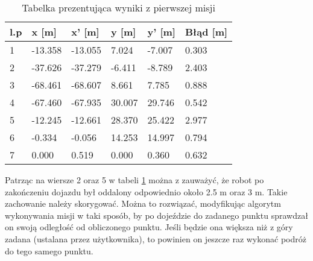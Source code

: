 {{        \begin{table}[h!]
            \centering
            \begin{tabular}{|l|l|l|l|l|l|}
                \hline
                l.p & x {[}m{]} & x' {[}m{]} & y {[}m{]} & y' {[}m{]} & Błąd {[}m{]} \\ \hline
                1   & -13.358   & -13.055    & 7.024     & -7.007     & 0.303 \\ \hline
                2   & -37.626   & -37.279    & -6.411    & -8.789     & 2.403 \\ \hline
                3   & -68.461   & -68.607    & 8.661     & 7.785      & 0.888 \\ \hline
                4   & -67.460   & -67.935    & 30.007    & 29.746     & 0.542 \\ \hline
                5   & -12.245   & -12.661    & 28.370    & 25.422     & 2.977 \\ \hline
                6   & -0.334    & -0.056     & 14.253    & 14.997     & 0.794 \\ \hline
                7   &  0.000       & 0.519    &  0.000   & 0.360      & 0.632 \\ \hline
            \end{tabular}
            \caption{Tabelka prezentująca wyniki z pierwszej misji}
            \label{second_mission_table}
        \end{table}

        Patrząc na wiersze 2 oraz 5 w tabeli \ref{second_mission_table} można z zauważyć, że robot po zakończeniu dojazdu był oddalony odpowiednio około 2.5 m oraz 3 m. Takie zachowanie należy skorygować. Można to rozwiązać, modyfikując algorytm wykonywania misji w taki sposób, by po dojeździe do zadanego punktu sprawdzał on swoją odległość od obliczonego punktu. Jeśli będzie ona większa niż z góry zadana (ustalana przez użytkownika), to powinien on jeszcze raz wykonać podróż do tego samego punktu.

}}
